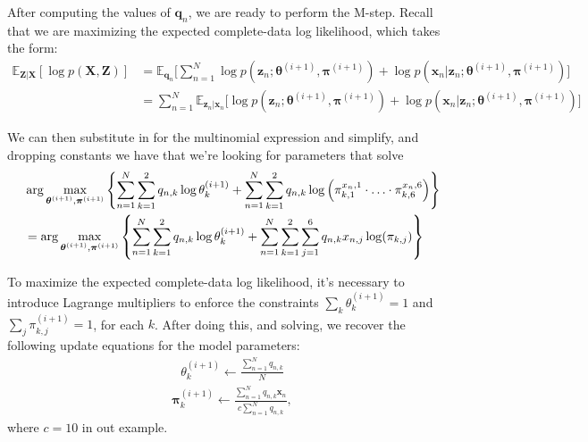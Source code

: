 After computing the values of $\textbf{q}_n$, we are ready to perform the M-step.
Recall that we are maximizing the expected complete-data log likelihood, which takes the form:
%
\begin{align} \label{M-for-multinomial}
    \mathbb{E}_{\textbf{Z}|\textbf{X}}[\log p(\textbf{X}, \textbf{Z})] &= \mathbb{E}_{\textbf{q}_n} \bigg[\sum_{n=1}^{N} \log p(\textbf{z}_n; \boldsymbol{\theta}^{(i+1)}, \boldsymbol{\pi}^{(i+1)}) + \log p(\textbf{x}_n | \textbf{z}_n; \boldsymbol{\theta}^{(i+1)}, \boldsymbol{\pi}^{(i+1)})\bigg] \\ 
                                                                       &= \sum_{n=1}^{N} \mathbb{E}_{\textbf{z}_n|\textbf{x}_n} \bigg[ \log p(\textbf{z}_n; \boldsymbol{\theta}^{(i+1)}, \boldsymbol{\pi}^{(i+1)}) + \log p(\textbf{x}_n | \textbf{z}_n; \boldsymbol{\theta}^{(i+1)}, \boldsymbol{\pi}^{(i+1)})\bigg]
\end{align}

We can then substitute in for the multinomial expression and simplify,
and dropping constants we have that we're looking for
parameters that solve
%
\begin{align}
&  \arg\max_{\boldsymbol{\theta}^{(i+1)}, \boldsymbol{\pi}^{(i+1)}}\left\{
                \sum_{n=1}^{N} \sum_{k=1}^{2} q_{n, k}  \log \theta_k^{(i+1)} +
  \sum_{n=1}^{N} \sum_{k=1}^{2}q_{n,k}\log\left(\pi_{k,1}^{x_n,1}\cdot\ldots\cdot\pi_{k,6}^{x_n,6}\right) \right\}
 \notag \\
  &=  \arg\max_{\boldsymbol{\theta}^{(i+1)}, \boldsymbol{\pi}^{(i+1)}}\left\{
                \sum_{n=1}^{N} \sum_{k=1}^{2} q_{n, k}  \log \theta_k^{(i+1)} +
    \sum_{n=1}^{N} \sum_{k=1}^{2}\sum_{j=1}^6 q_{n,k}x_{n,j}\log(\pi_{k,j})\right\}
    \label{eq:dpnew1}
\end{align}

To maximize the expected complete-data log likelihood, it's necessary to introduce Lagrange multipliers to enforce the constraints $\sum_{k} \theta_k^{(i+1)} = 1$ and $\sum_{j} \pi_{k, j}^{(i+1)} = 1$, for each $k$. After doing this,
and solving, we recover the following update equations for the model parameters:
%
\begin{align*}
    \theta_{k}^{(i+1)} \leftarrow \frac{\sum_{n=1}^{N} q_{n, k}}{N}
\end{align*}
\begin{align*}
    \boldsymbol{\pi}_{k}^{(i+1)} \leftarrow \frac{\sum_{n=1}^{N} q_{n, k} \textbf{x}_{n}}{c \sum_{n=1}^{N} q_{n, k} },
\end{align*}
%
where $c=10$ in out example.

